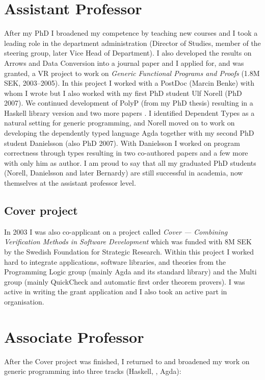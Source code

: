 \section{Assistant Professor}
After my PhD I broadened my competence by teaching new courses and I
took a leading role in the department administration (Director of
Studies, member of the steering group, later Vice Head of Department).
%
I also developed the results on Arrows and Data Conversion into a
journal paper \citep{janssonjeuring-dataconv} and I applied for, and
was granted, a VR project to work on \emph{Generic Functional Programs
  and Proofs} (1.8M SEK, 2003--2005).
%
In this project I worked with a PostDoc (Marcin Benke) with whom I
wrote \citep{benkedybjerjansson2003:gendepty} but I also worked with my
first PhD student Ulf Norell (PhD 2007).
%
We continued development of PolyP (from my PhD thesis) resulting in a
Haskell library version \citep{jansson:PolyP2compiler} and two more
papers \citep{norelljansson2003:PolyHaskell, norelljansson04:ProtoGen}.
%
I identified Dependent Types as a natural setting for generic
programming, and Norell moved on to work on developing the dependently
typed language Agda together with my second PhD student Danielsson
(also PhD 2007).
%
With Danielsson I worked on program correctness through types
resulting in two co-authored papers
\citep{danielssonjansson04:chasingbottoms,
  danielssonetal06:fastandloose} and a few more with only him as
author.
%
I am proud to say that all my graduated PhD students (Norell,
Danielsson and later Bernardy) are still successful in academia, now
themselves at the assistant professor level.

\subsection{Cover project}
In 2003 I was also co-applicant on a project called \emph{Cover ---
  Combining Verification Methods in Software Development} which was
funded with 8M SEK by the Swedish Foundation for Strategic Research.
%
Within this project I worked hard to integrate applications, software
libraries, and theories from the Programming Logic group (mainly Agda
and its standard library) and the Multi group (mainly QuickCheck and
automatic first order theorem provers).
%
I was active in writing the grant application and I also took an
active part in organisation.

\section{Associate Professor}
After the Cover project was finished, I returned to and broadened my
work on generic programming into three tracks (Haskell, \Cpp, Agda):
%
